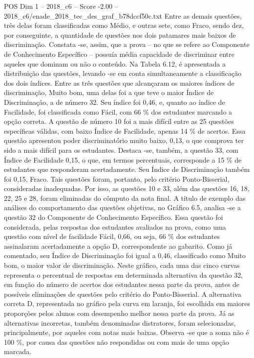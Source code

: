 \begin{textsample}{POS Dim 1 – 2018\_c6 – Score -2.00 – 2018\_c6/enade\_2018\_tec\_des\_graf\_b78dccf50c.txt}
Entre as demais questões, três delas foram classificadas como Médio, e outras sete, como Fraco, sendo dez, por conseguinte, a quantidade de questões nos dois patamares mais baixos de discriminação.
Constata -se, assim, que a prova – no que se refere ao Componente de Conhecimento Específico – possuía média capacidade de discriminar entre aqueles que dominam ou não o conteúdo.
Na Tabela 6.12, é apresentada a distribuição das questões, levando -se em conta simultaneamente a classificação dos dois índices.
Entre as três questões que alcançaram os maiores índices de discriminação, Muito bom, uma delas foi a que teve o maior Índice de Discriminação, a de número 32.
Seu índice foi 0,46, e, quanto ao índice de Facilidade, foi classificada como Fácil, com 66 \% dos estudantes marcando a opção correta.
A questão de número 10 foi a mais difícil entre as 25 questões específicas válidas, com baixo Índice de Facilidade, apenas 14 \% de acertos.
Essa questão apresentou poder discriminatório muito baixo, 0,13, o que comprova ter sido a mais difícil para os estudantes.
Destaca -se, também, a questão 33, com Índice de Facilidade 0,15, o que, em termos percentuais, corresponde a 15 \% de estudantes que responderam acertadamente.
Seu Índice de Discriminação também foi 0,15, Fraco.
Tais questões foram, portanto, pelo critério Ponto-Bisserial, consideradas inadequadas.
Por isso, as questões 10 e 33, além das questões 16, 18, 22, 25 e 28, foram eliminadas do cômputo da nota final.
A título de exemplo das análises do comportamento das questões objetivas, no Gráfico 6.5, analisa -se a questão 32 do Componente de Conhecimento Específico.
Essa questão foi considerada, pelas respostas dos estudantes avaliados na prova, como uma questão com nível de facilidade Fácil, 0,66, ou seja, 66 \% dos estudantes assinalaram acertadamente a opção D, correspondente ao gabarito.
Como já comentado, seu Índice de Discriminação foi igual a 0,46, classificado como Muito bom, o maior valor de discriminação.
Neste gráfico, cada uma das cinco curvas representa o percentual de respostas em determinada alternativa da questão 32, em função do número de acertos dos estudantes nessa parte da prova, antes de possíveis eliminações de questões pelo critério do Ponto-Bisserial.
A alternativa correta D, representada no gráfico pela curva em laranja, foi escolhida em maiores proporções pelos alunos com desempenho melhor nessa parte da prova.
Já as alternativas incorretas, também denominadas distratores, foram selecionadas, principalmente, por aqueles com notas mais baixas.
Observa -se que a soma não é 100 \%, por causa das questões não respondidas ou com mais de uma opção marcada.

\end{textsample}
